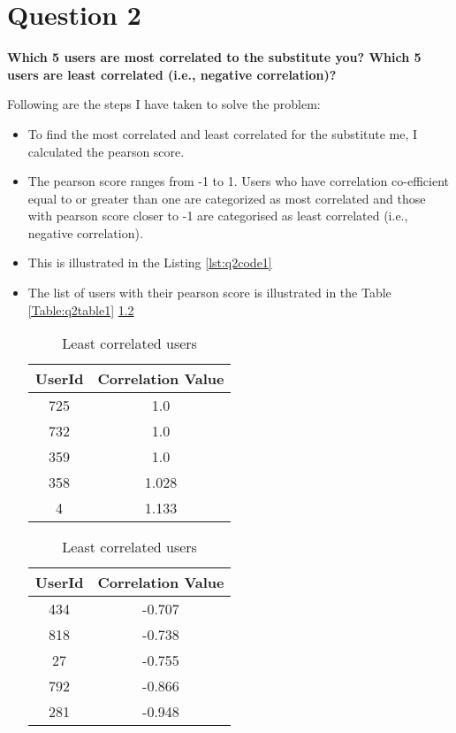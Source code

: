 \chapter{Question 2}
\label{avoiding-uri-aliases} 

\textbf { Which 5 users are most correlated to the substitute you? Which 5 users are least correlated (i.e., negative correlation)?}

Following are the steps I have taken to solve the problem:

\begin{itemize}
\item To find the most correlated and least correlated for the substitute me, I calculated the pearson score. 
\item The pearson score ranges from -1 to 1. Users who have correlation co-efficient equal to or greater than one are categorized as most correlated and those with pearson score closer to -1 are categorised as least correlated (i.e., negative correlation).
\item This is illustrated in the Listing \ref{lst:q2code1}
\item The list of users with their pearson score is illustrated in the Table \ref{Table:q2table1} \ref{Table:q2table2}

\begin{table}

\caption{Most correlated users}
\label{Table:q2table1}
\begin{center}
\begin{tabular}{| c | c |}
\hline
UserId  & Correlation Value\\ \hline  
725 &	1.0					\\ \hline  
732 & 	1.0					\\ \hline   
359 &	1.0					\\ \hline  
358 &	1.028	\\ \hline 
4 &	1.133	 \\ \hline

\hline
\end{tabular}
\end{center}

\caption{Least correlated users}
\label{Table:q2table2}
\begin{center}
\begin{tabular}{| c | c |}
\hline
UserId  & Correlation Value\\ \hline  
434 &	-0.707				\\ \hline  
818 & 	-0.738					\\ \hline   
27 &	-0.755			\\ \hline  
792 &	-0.866\\ \hline 
281 &	-0.948 \\ \hline

\hline
\end{tabular}
\end{center}
\end{table}
\end{itemize}



